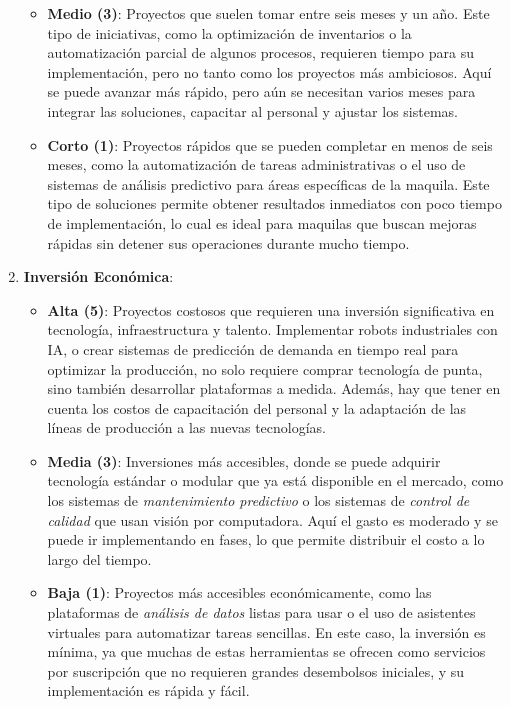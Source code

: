 \begin{enumerate}
\begin{itemize}
        \item \textbf{Medio (3)}: Proyectos que suelen tomar entre seis meses y un año. Este tipo de iniciativas, como la optimización de inventarios o la automatización parcial de algunos procesos, requieren tiempo para su implementación, pero no tanto como los proyectos más ambiciosos. Aquí se puede avanzar más rápido, pero aún se necesitan varios meses para integrar las soluciones, capacitar al personal y ajustar los sistemas.
        
        \item \textbf{Corto (1)}: Proyectos rápidos que se pueden completar en menos de seis meses, como la automatización de tareas administrativas o el uso de sistemas de análisis predictivo para áreas específicas de la maquila. Este tipo de soluciones permite obtener resultados inmediatos con poco tiempo de implementación, lo cual es ideal para maquilas que buscan mejoras rápidas sin detener sus operaciones durante mucho tiempo.
    \end{itemize}

    \item \textbf{Inversión Económica}:
    \begin{itemize}
        \item \textbf{Alta (5)}: Proyectos costosos que requieren una inversión significativa en tecnología, infraestructura y talento. Implementar robots industriales con IA, o crear sistemas de predicción de demanda en tiempo real para optimizar la producción, no solo requiere comprar tecnología de punta, sino también desarrollar plataformas a medida. Además, hay que tener en cuenta los costos de capacitación del personal y la adaptación de las líneas de producción a las nuevas tecnologías.
        
        \item \textbf{Media (3)}: Inversiones más accesibles, donde se puede adquirir tecnología estándar o modular que ya está disponible en el mercado, como los sistemas de \textit{mantenimiento predictivo} o los sistemas de \textit{control de calidad} que usan visión por computadora. Aquí el gasto es moderado y se puede ir implementando en fases, lo que permite distribuir el costo a lo largo del tiempo.
        
        \item \textbf{Baja (1)}: Proyectos más accesibles económicamente, como las plataformas de \textit{análisis de datos} listas para usar o el uso de asistentes virtuales para automatizar tareas sencillas. En este caso, la inversión es mínima, ya que muchas de estas herramientas se ofrecen como servicios por suscripción que no requieren grandes desembolsos iniciales, y su implementación es rápida y fácil.
    \end{itemize}


\end{enumerate}
